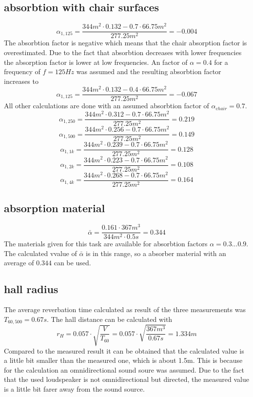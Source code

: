 \documentclass{article}
\begin{document}
\subsection{absorbtion with chair surfaces}
$$\alpha_{1,125}=\frac{344m^2\cdot 0.132-0.7\cdot 66.75m^2}{277.25m^2}=-0.004$$
The absorbtion factor is negative which means that the chair absorption factor is overestimated. Due to the fact that absorbtion decreases with lower frequencies the absorption factor is lower at low frequencies.  An factor of $\alpha=0.4$ for a frequency of $f=125Hz$ was assumed and the resulting absorbtion factor increases to
 $$\alpha_{1,125}=\frac{344m^2\cdot 0.132-0.4\cdot 66.75m^2}{277.25m^2}=-0.067$$
All other calculations are done with an assumed absorbtion factor of $\alpha_{chair}=0.7$.
 $$\alpha_{1,250}=\frac{344m^2\cdot 0.312-0.7\cdot 66.75m^2}{277.25m^2}=0.219$$
 $$\alpha_{1,500}=\frac{344m^2\cdot 0.256-0.7\cdot 66.75m^2}{277.25m^2}=0.149$$
 $$\alpha_{1,1k}=\frac{344m^2\cdot 0.239-0.7\cdot 66.75m^2}{277.25m^2}=0.128$$
 $$\alpha_{1,2k}=\frac{344m^2\cdot 0.223-0.7\cdot 66.75m^2}{277.25m^2}=0.108$$
 $$\alpha_{1,4k}=\frac{344m^2\cdot 0.268-0.7\cdot 66.75m^2}{277.25m^2}=0.164$$

\subsection{absorption material}
$$\bar{\alpha}=\frac{0.161\cdot 367m^3}{344m^2\cdot 0.5s}=0.344$$
The materials given for this task are available for absorbtion factors $\alpha=0.3 ... 0.9$. The calculated vvalue of $\bar{\alpha}$ is in this range, so a absorber material with an average of $0.344$ can be used.

\subsection{hall radius}
The average reverbation time calculated as result of the three measurements was $T_{60,500}=0.67s$. The hall distance can be calculated with 
$$r_H=0.057\cdot\sqrt{\frac{V}{T_{60}}}=0.057\cdot\sqrt{\frac{367m^3}{0.67s}}=1.334m$$
Compared to the measured result it can be obtained that the calculated value is a little bit smaller than the measured one, which is about 1.5m. This is because for the calculation an omnidirectional sound soure was assumed. Due to the fact that the used loudspeaker is not omnidirectional but directed, the measured value is a little bit farer away from the sound source. 

\newpage
\end{document}
